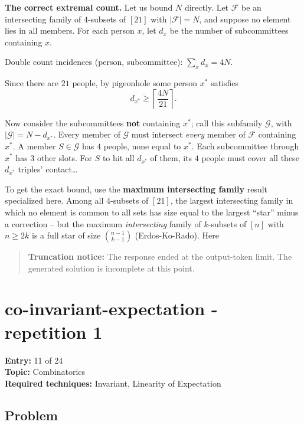 \documentclass[
  11pt,
  letterpaper,
]{article}
\begin{document}
\textbf{The correct extremal count.} Let us bound \(N\) directly. Let
\(\mathcal F\) be an intersecting family of \(4\)-subsets of \([21]\)
with \(|\mathcal F| = N\), and suppose no element lies in all members.
For each person \(x\), let \(d_x\) be the number of subcommittees
containing \(x\).

Double count incidences (person, subcommittee): \(\sum_{x} d_x = 4N\).

Since there are \(21\) people, by pigeonhole some person \(x^{*}\)
satisfies \[d_{x^{*}} \ge \left\lceil \frac{4N}{21}\right\rceil.\]

Now consider the subcommittees \textbf{not} containing \(x^{*}\); call
this subfamily \(\mathcal G\), with \(|\mathcal G| = N - d_{x^{*}}\).
Every member of \(\mathcal G\) must intersect \emph{every} member of
\(\mathcal F\) containing \(x^{*}\). A member \(S\in\mathcal G\) has
\(4\) people, none equal to \(x^{*}\). Each subcommittee through
\(x^{*}\) has \(3\) other slots. For \(S\) to hit all \(d_{x^{*}}\) of
them, its \(4\) people must cover all these \(d_{x^{*}}\) triples'
contact\ldots{}

To get the exact bound, use the \textbf{maximum intersecting family}
result specialized here. Among all \(4\)-subsets of \([21]\), the
largest intersecting family in which no element is common to all sets
has size equal to the largest ``star'' minus a correction -- but the
maximum \emph{intersecting} family of \(k\)-subsets of \([n]\) with
\(n\ge 2k\) is a full star of size \(\binom{n-1}{k-1}\) (Erdos-Ko-Rado).
Here

\begin{quote}
\textbf{Truncation notice:} The response ended at the output-token
limit. The generated solution is incomplete at this point.
\end{quote}

\clearpage

\section{co-invariant-expectation - repetition
1}\label{co-invariant-expectation---repetition-1}

\textbf{Entry:} 11 of 24\\
\textbf{Topic:} Combinatorics\\
\textbf{Required techniques:} Invariant, Linearity of Expectation

\subsection{Problem}\label{problem-10}
\end{document}
